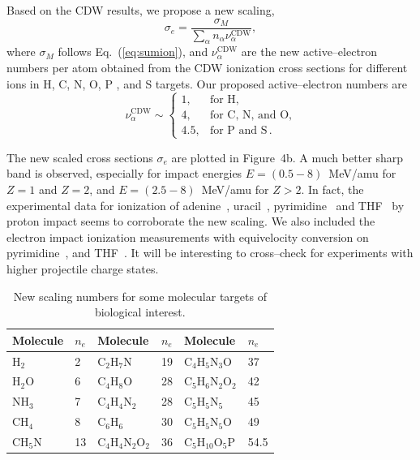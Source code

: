 \documentclass[preprint,12pt]{article}
\begin{document}
Based on the CDW results, we propose a new scaling,
\begin{equation}
\sigma_{e}=\frac{\sigma_M}{\sum\limits_{\alpha}n_{\alpha}
\nu_{\alpha}^{\text{CDW}}},
\label{32} 
\end{equation}
where $\sigma_M$ follows Eq.~(\ref{eq:sumion}), and 
$\nu_{\alpha}^{\text{CDW}}$ are the new active--electron numbers 
per atom obtained from the CDW ionization cross sections for 
different ions in H, C, N, O, P , and S targets. 
Our proposed active--electron numbers are
\begin{equation}
\nu_{\alpha }^{\text{CDW}} \sim\left\{ 
\begin{array}{ll}
1, & \text{for H,} \\
4, & \text{for C, N, and O,} \\ 
4.5, & \text{for P and S}\,.
\end{array}
\right. 
\label{eq:scalingCDW}
\end{equation}

The new scaled cross sections $\sigma_{e}$ are plotted in Figure~4b. 
A much better sharp band is observed, especially for impact energies 
$E=(0.5-8)$~MeV/amu for $Z=1$ and $Z=2$, and $E=(2.5-8)$~MeV/amu for 
$Z>2$. In fact, the experimental data for ionization of 
adenine~\cite{iriki2011}, uracil~\cite{itoh2013}, 
pyrimidine~\cite{wolff2014} and THF~\cite{wang2016} by proton impact 
seems to corroborate the new scaling. 
We also included the electron impact ionization measurements with equivelocity 
conversion on pyrimidine~\cite{bug2017}, and THF~\cite{bug2017,wolf2019,fuss2009}. 
It will be interesting to cross--check for experiments with higher 
projectile charge states. 

\begin{table}[H]
\begin{center}
\begin{tabular}{|ll|ll|ll|}
\hline
 Molecule & $n_e$ &Molecule         & $n_e$ & Molecule             & $n_e$ \\
\hline
 H$_2$    & 2  & C$_2$H$_7$N         & 19    & C$_4$H$_5$N$_3$O     & 37    \\
 H$_2$O   & 6  & C$_4$H$_8$O         & 28    & C$_5$H$_6$N$_2$O$_2$ & 42    \\
 NH$_3$   & 7  & C$_4$H$_4$N$_2$     & 28    & C$_5$H$_5$N$_5$      & 45    \\
 CH$_4$   & 8  & C$_6$H$_6$          & 30    & C$_5$H$_5$N$_5$O     & 49    \\
 CH$_5$N  & 13 & C$_4$H$_4$N$_2$O$_2$& 36    & C$_5$H$_{10}$O$_5$P  & 54.5  \\
 \hline
\end{tabular}
\caption{New scaling numbers for some molecular targets of biological interest.}
\label{nn}
\end{center}
\end{table}
\end{document}
